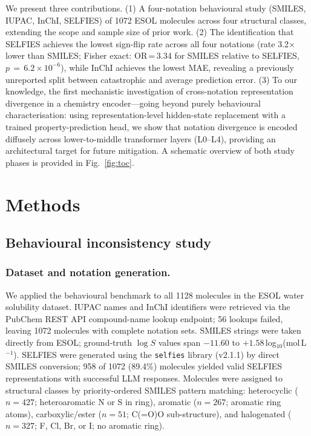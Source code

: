 \documentclass[twoside,twocolumn,9pt]{article}
\newcommand{\logS}{\ensuremath{\log S}}
\begin{document}
We present three contributions. (1) A four-notation behavioural study (SMILES, IUPAC, InChI, SELFIES) of 1072 ESOL molecules across four structural classes, extending the scope and sample size of prior work.\cite{yan2025,ganeeva2025} (2) The identification that SELFIES achieves the lowest sign-flip rate across all four notations (rate 3.2$\times$ lower than SMILES; Fisher exact: OR\,=\,3.34 for SMILES relative to SELFIES, $p\,=\,6.2\!\times\!10^{-6}$), while InChI achieves the lowest MAE, revealing a previously unreported split between catastrophic and average prediction error. (3) To our knowledge, the first mechanistic investigation of cross-notation representation divergence in a chemistry encoder---going beyond purely behavioural characterisation: using representation-level hidden-state replacement with a trained property-prediction head, we show that notation divergence is encoded diffusely across lower-to-middle transformer layers (L0--L4), providing an architectural target for future mitigation. A schematic overview of both study phases is provided in Fig.~\ref{fig:toc}.

\section{Methods}

\subsection{Behavioural inconsistency study}

\subsubsection{Dataset and notation generation.~~} We applied the behavioural benchmark to all 1128 molecules in the ESOL water solubility dataset.\cite{delaney2004} IUPAC names and InChI identifiers were retrieved via the PubChem REST API compound-name lookup endpoint;\cite{kim2021} 56 lookups failed, leaving 1072 molecules with complete notation sets. SMILES strings were taken directly from ESOL; ground-truth $\logS$ values span $-11.60$ to $+1.58$\,log$_{10}$(mol\,L$^{-1}$). SELFIES were generated using the \texttt{selfies} library (v2.1.1)\cite{krenn2020} by direct SMILES conversion; 958 of 1072 (89.4\%) molecules yielded valid SELFIES representations with successful LLM responses. Molecules were assigned to structural classes by priority-ordered SMILES pattern matching: heterocyclic ($n=427$; heteroaromatic N or S in ring), aromatic ($n=267$; aromatic ring atoms), carboxylic/ester ($n=51$; C(=O)O sub-structure), and halogenated ($n=327$; F, Cl, Br, or I; no aromatic ring).
\end{document}
